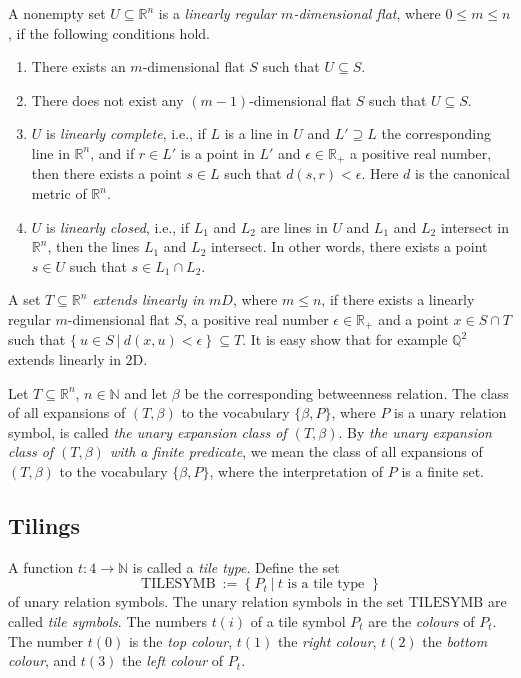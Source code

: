 \documentclass{LMCS}
\theoremstyle{plain}
\newcommand{\rsq}{\mathbb{R}^n}
\begin{document}
%
A nonempty set $U\subseteq\mathbb{R}^n$ is a \emph{linearly regular $m$-dimensional flat}, where $0\leq m\leq n$, if the following conditions hold.
%
%
%
\begin{enumerate}
%
\item
There exists an $m$-dimensional flat $S$ such that $U\subseteq S$. 
%
\item
There does not exist any $(m-1)$-dimensional flat $S$ such that $U\subseteq S$.
%
\item
$U$ is \emph{linearly complete}, i.e., if $L$ is a line in $U$ and $L'\supseteq L$ the corresponding line in $\mathbb{R}^n$,
%
and if $r\in L'$ is a point in $L'$ and $\epsilon\in\mathbb{R}_+$ a positive real number, then there exists a point $s\in L$
%
such that $d(s,r) < \epsilon$. Here $d$ is the canonical metric of $\mathbb{R}^n$.
\item
$U$ is \emph{linearly closed}, i.e., if $L_1$ and $L_2$ are lines in $U$ and $L_1$ and $L_2$ intersect in $\mathbb{R}^n$, 
%
then the lines $L_1$ and $L_2$ intersect. In other words, there exists a point $s\in U$ such that $s\in L_1\cap L_2$.
%
\end{enumerate} 
%



%
\noindent A set $T\subseteq\mathbb{R}^n$ \emph{extends linearly in $mD$}, where $m\leq n$, if
%
there exists a linearly regular $m$-dimensional flat $S$, a positive real number $\epsilon\in\mathbb{R}_+$ and a
%
point $x \in S\cap T$ such that 
%
%
%
$\{\ u\in S\ |\ d(x,u)<\epsilon\ \}\ \subseteq T.$
%
It is easy show that for example $\mathbb{Q}^2$ extends linearly in ${\mathrm{\mathrm{2D}}}$.
%

Let $T\subseteq \rsq$, $n\in\mathbb{N}$ and let $\beta$ be the corresponding betweenness relation.  The class of all expansions of $(T,\beta)$ to the vocabulary $\{\beta,P\}$, where $P$ is a unary relation symbol, is called \emph{the unary expansion class of $(T,\beta)$}. By \emph{the unary expansion class of $(T,\beta)$ with a finite predicate}, we mean the class of all expansions of $(T,\beta)$ to the vocabulary $\{\beta,P\}$, where the interpretation of $P$ is a finite set.
%
\subsection{Tilings}
%
A function $t:4\longrightarrow\mathbb{N}$ is called a \emph{tile type}.
%
Define the set
%
%
%
$$\mathrm{TILESYMB}\ :=\ \{\ P_t\ |\ t\text{ is a tile type }\ \}$$
%
%
%
 of unary relation symbols.
%
The unary relation symbols in the set $\mathrm{TILESYMB}$ are
%
called \emph{tile symbols}.
%
The numbers $t(i)$ of a tile symbol $P_t$ are the \emph{colours} of $P_t$.
%
The number $t(0)$ is the \emph{top colour}, $t(1)$ the \emph{right colour},
%
$t(2)$ the \emph{bottom colour}, and $t(3)$ the \emph{left colour} of $P_t$.
%
\end{document}
